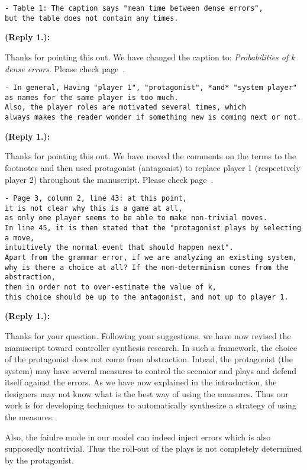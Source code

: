 \documentclass[times,10pt,twocolumn]{article}
\newcounter{cabbage0}
\newcounter{cabbage1}
\newcounter{cabbage2}
\newcounter{cabbage3}
\newcounter{bean0}
\newcounter{bean1}
\newcounter{bean2}
\newcounter{bean3}
\newcounter{bean4}
\newcounter{bean5}
\newcounter{bean6}
\newenvironment{reply1}{\begin{list}{\bf (Reply 1.\arabic{bean1}):} 
        {\usecounter{bean1}\setcounter{bean1}{\value{cabbage1}} \item \setcounter{cabbage1}{\value{bean1}} 
        }
}{\end{list}}
\begin{document}
\begin{verbatim} 
- Table 1: The caption says "mean time between dense errors", 
but the table does not contain any times.
\end{verbatim}
\begin{reply1} 
Thanks for pointing this out. 
We have changed the caption to: {\em Probabilities of $k$ dense errors}.  
Please check page~\pageref{tab.mtbf}. 
\end{reply1} 
\begin{verbatim} 
- In general, Having "player 1", "protagonist", *and* "system player" 
as names for the same player is too much. 
Also, the player roles are motivated several times, which 
always makes the reader wonder if something new is coming next or not.
\end{verbatim}
\begin{reply1} 
Thanks for pointing this out. 
We have moved the comments on the terms to the footnotes and 
then used protagonist (antagonist) to replace 
player 1 (respectively player 2) throughout the manuscript. 
Please check page~\pageref{reply1.protagonist.player1}. 
\end{reply1} 
\begin{verbatim} 
- Page 3, column 2, line 43: at this point, 
it is not clear why this is a game at all, 
as only one player seems to be able to make non-trivial moves. 
In line 45, it is then stated that the "protagonist plays by selecting a move, 
intuitively the normal event that should happen next". 
Apart from the grammar error, if we are analyzing an existing system, 
why is there a choice at all? If the non-determinism comes from the abstraction,
then in order not to over-estimate the value of k, 
this choice should be up to the antagonist, and not up to player 1.
\end{verbatim}
\begin{reply1} \label{reply1m.abstraction}
Thanks for your question. 
Following your suggestions, we have 
now revised the manuscript toward controller synthesis research.  
In such a framework, the choice of the protagonist does not come from 
abstraction.  
Intead, the protagonist (the system) may have several measures to control 
the scenaior and plays and defend itself against the errors. 
As we have now explained in the introduction, 
the designers may not know what is the best way of using the measures.  
Thus our work is for developing techniques to automatically synthesize a 
strategy of using the measures.  

Also, the faiulre mode in our model can indeed inject errors 
which is also supposedly nontrivial. 
Thus the roll-out of the plays is not completely determined by the protagonist. 
\end{reply1} 
\end{document}

